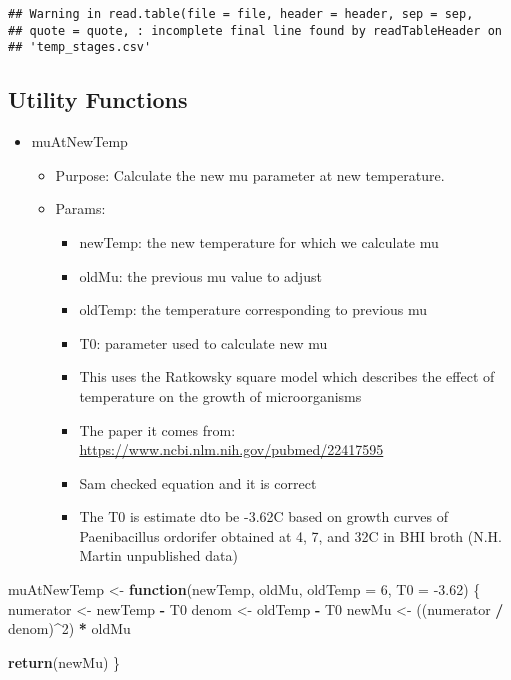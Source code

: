 \documentclass[]{article}
\newenvironment{Shaded}{\begin{snugshade}}{\end{snugshade}}
\newcommand{\ControlFlowTok}[1]{\textcolor[rgb]{0.13,0.29,0.53}{\textbf{#1}}}
\newcommand{\DataTypeTok}[1]{\textcolor[rgb]{0.13,0.29,0.53}{#1}}
\newcommand{\DecValTok}[1]{\textcolor[rgb]{0.00,0.00,0.81}{#1}}
\newcommand{\FloatTok}[1]{\textcolor[rgb]{0.00,0.00,0.81}{#1}}
\newcommand{\KeywordTok}[1]{\textcolor[rgb]{0.13,0.29,0.53}{\textbf{#1}}}
\newcommand{\NormalTok}[1]{#1}
\newcommand{\OperatorTok}[1]{\textcolor[rgb]{0.81,0.36,0.00}{\textbf{#1}}}
\newcommand{\StringTok}[1]{\textcolor[rgb]{0.31,0.60,0.02}{#1}}
\providecommand{\tightlist}{%
  \setlength{\itemsep}{0pt}\setlength{\parskip}{0pt}}
\begin{document}
\begin{verbatim}
## Warning in read.table(file = file, header = header, sep = sep,
## quote = quote, : incomplete final line found by readTableHeader on
## 'temp_stages.csv'
\end{verbatim}

\hypertarget{utility-functions}{%
\subsection{Utility Functions}\label{utility-functions}}

\begin{itemize}
\tightlist
\item
  muAtNewTemp

  \begin{itemize}
  \tightlist
  \item
    Purpose: Calculate the new mu parameter at new temperature.
  \item
    Params:

    \begin{itemize}
    \tightlist
    \item
      newTemp: the new temperature for which we calculate mu
    \item
      oldMu: the previous mu value to adjust
    \item
      oldTemp: the temperature corresponding to previous mu
    \item
      T0: parameter used to calculate new mu
    \item
      This uses the Ratkowsky square model which describes the effect of
      temperature on the growth of microorganisms
    \item
      The paper it comes from:
      \url{https://www.ncbi.nlm.nih.gov/pubmed/22417595}
    \item
      Sam checked equation and it is correct
    \item
      The T0 is estimate dto be -3.62C based on growth curves of
      Paenibacillus ordorifer obtained at 4, 7, and 32C in BHI broth
      (N.H. Martin unpublished data)
    \end{itemize}
  \end{itemize}
\end{itemize}

\begin{Shaded}
\begin{Highlighting}[]
\NormalTok{muAtNewTemp <-}\StringTok{ }\ControlFlowTok{function}\NormalTok{(newTemp, oldMu, }\DataTypeTok{oldTemp =} \DecValTok{6}\NormalTok{, }\DataTypeTok{T0 =} \FloatTok{-3.62}\NormalTok{) \{}
\NormalTok{  numerator <-}\StringTok{ }\NormalTok{newTemp }\OperatorTok{-}\StringTok{ }\NormalTok{T0}
\NormalTok{  denom <-}\StringTok{ }\NormalTok{oldTemp }\OperatorTok{-}\StringTok{ }\NormalTok{T0}
\NormalTok{  newMu <-}\StringTok{ }\NormalTok{((numerator }\OperatorTok{/}\StringTok{ }\NormalTok{denom)}\OperatorTok{^}\DecValTok{2}\NormalTok{) }\OperatorTok{*}\StringTok{ }\NormalTok{oldMu}
  
  \KeywordTok{return}\NormalTok{(newMu)}
\NormalTok{\}}
\end{Highlighting}
\end{Shaded}
\end{document}
